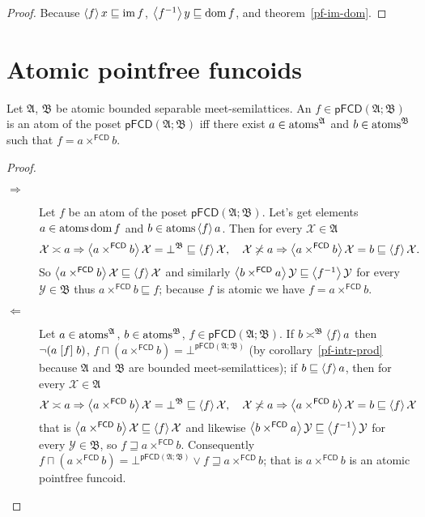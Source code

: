 \begin{proof}
Because $\left\langle f\right\rangle x\sqsubseteq\operatorname{im} f$, $\left\langle f^{-1}\right\rangle y\sqsubseteq\operatorname{dom} f$, and theorem~\ref{pf-im-dom}.
\end{proof}

\section{Atomic pointfree funcoids}
\begin{thm}
\label{pf-atom}Let $\mathfrak{A}$, $\mathfrak{B}$ be atomic bounded separable meet-semilattices.
An $f\in\mathsf{pFCD}(\mathfrak{A};\mathfrak{B})$
is an atom of the poset $\mathsf{pFCD}(\mathfrak{A};\mathfrak{B})$
iff there exist $a\in\operatorname{atoms}^{\mathfrak{A}}$ and $b\in\operatorname{atoms}^{\mathfrak{B}}$
such that $f=a\times^{\mathsf{FCD}}b$.\end{thm}
\begin{proof}
~
\begin{description}
\item [{$\Rightarrow$}] Let $f$ be an atom of the poset $\mathsf{pFCD}(\mathfrak{A};\mathfrak{B})$.
Let's get elements $a\in\operatorname{atoms}\operatorname{dom} f$ and $b\in\operatorname{atoms}\left\langle f\right\rangle a$.
Then for every $\mathcal{X}\in\mathfrak{A}$
\[
\mathcal{X}\asymp a\Rightarrow\left\langle a\times^{\mathsf{FCD}}b\right\rangle\mathcal{X}=\bot^{\mathfrak{B}}\sqsubseteq\left\langle f\right\rangle\mathcal{X},\quad\mathcal{X}\not\asymp a\Rightarrow\left\langle a\times^{\mathsf{FCD}}b\right\rangle\mathcal{X}=b\sqsubseteq\left\langle f\right\rangle\mathcal{X}.
\]
So $\left\langle a\times^{\mathsf{FCD}}b\right\rangle\mathcal{X}\sqsubseteq\left\langle f\right\rangle\mathcal{X}$ and similarly
$\left\langle b\times^{\mathsf{FCD}}a\right\rangle\mathcal{Y}\sqsubseteq\left\langle f^{-1}\right\rangle\mathcal{Y}$ for every~$\mathcal{Y}\in\mathfrak{B}$ thus
$a\times^{\mathsf{FCD}}b\sqsubseteq f$; because $f$ is atomic
we have $f=a\times^{\mathsf{FCD}}b$.
\item [{$\Leftarrow$}] Let $a\in\operatorname{atoms}^{\mathfrak{A}}$, $b\in\operatorname{atoms}^{\mathfrak{B}}$,
$f\in\mathsf{pFCD}(\mathfrak{A};\mathfrak{B})$. If $b\asymp^{\mathfrak{B}}\left\langle f\right\rangle a$
then $\lnot(a\mathrel{\left[f\right]}b)$, $f\sqcap(a\times^{\mathsf{FCD}}b)=\bot^{\mathsf{pFCD}(\mathfrak{A};\mathfrak{B})}$
(by corollary~\ref{pf-intr-prod} because $\mathfrak{A}$ and $\mathfrak{B}$ are bounded meet-semilattices);
if $b\sqsubseteq\left\langle f\right\rangle a$, then for every $\mathcal{X}\in\mathfrak{A}$
\[
\mathcal{X}\asymp a\Rightarrow\left\langle a\times^{\mathsf{FCD}}b\right\rangle\mathcal{X}=\bot^{\mathfrak{B}}\sqsubseteq\left\langle f\right\rangle\mathcal{X},\quad\mathcal{X}\not\asymp a\Rightarrow\left\langle a\times^{\mathsf{FCD}}b\right\rangle\mathcal{X}=b\sqsubseteq\left\langle f\right\rangle\mathcal{X}
\]
that is $\left\langle a\times^{\mathsf{FCD}}b\right\rangle\mathcal{X}\sqsubseteq\left\langle f\right\rangle\mathcal{X}$ and likewise
$\left\langle b\times^{\mathsf{FCD}}a\right\rangle\mathcal{Y}\sqsubseteq\left\langle f^{-1}\right\rangle\mathcal{Y}$ for every $\mathcal{Y}\in\mathfrak{B}$, so
$f\sqsupseteq a\times^{\mathsf{FCD}}b$. Consequently $f\sqcap(a\times^{\mathsf{FCD}}b)=\bot^{\mathsf{pFCD}(\mathfrak{A};\mathfrak{B})}\lor f\sqsupseteq a\times^{\mathsf{FCD}}b$;
that is $a\times^{\mathsf{FCD}}b$ is an atomic pointfree funcoid.
\end{description}
\end{proof}
